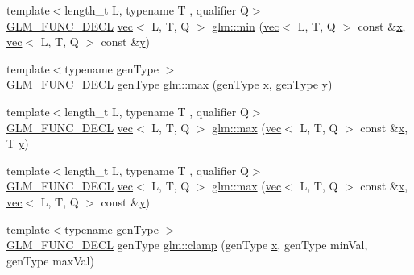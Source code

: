 \begin{DoxyCompactItemize}
\item 
{\footnotesize template$<$length\+\_\+t L, typename T , qualifier Q$>$ }\\\hyperlink{setup_8hpp_ab2d052de21a70539923e9bcbf6e83a51}{G\+L\+M\+\_\+\+F\+U\+N\+C\+\_\+\+D\+E\+CL} \hyperlink{structglm_1_1vec}{vec}$<$ L, T, Q $>$ \hyperlink{group__core__func__common_ga734a374ca5c808e7bd9f74b6acfd7478}{glm\+::min} (\hyperlink{structglm_1_1vec}{vec}$<$ L, T, Q $>$ const \&\hyperlink{_s_d_l__opengl_8h_ad0e63d0edcdbd3d79554076bf309fd47}{x}, \hyperlink{structglm_1_1vec}{vec}$<$ L, T, Q $>$ const \&\hyperlink{_s_d_l__opengl_8h_a1675d9d7bb68e1657ff028643b4037e3}{y})
\item 
{\footnotesize template$<$typename gen\+Type $>$ }\\\hyperlink{setup_8hpp_ab2d052de21a70539923e9bcbf6e83a51}{G\+L\+M\+\_\+\+F\+U\+N\+C\+\_\+\+D\+E\+CL} gen\+Type \hyperlink{group__core__func__common_ga98caa7f95a94c86a86ebce893a45326c}{glm\+::max} (gen\+Type \hyperlink{_s_d_l__opengl_8h_ad0e63d0edcdbd3d79554076bf309fd47}{x}, gen\+Type \hyperlink{_s_d_l__opengl_8h_a1675d9d7bb68e1657ff028643b4037e3}{y})
\item 
{\footnotesize template$<$length\+\_\+t L, typename T , qualifier Q$>$ }\\\hyperlink{setup_8hpp_ab2d052de21a70539923e9bcbf6e83a51}{G\+L\+M\+\_\+\+F\+U\+N\+C\+\_\+\+D\+E\+CL} \hyperlink{structglm_1_1vec}{vec}$<$ L, T, Q $>$ \hyperlink{group__core__func__common_gae8b0964d30deabd0867b8d7ac44f067e}{glm\+::max} (\hyperlink{structglm_1_1vec}{vec}$<$ L, T, Q $>$ const \&\hyperlink{_s_d_l__opengl_8h_ad0e63d0edcdbd3d79554076bf309fd47}{x}, T \hyperlink{_s_d_l__opengl_8h_a1675d9d7bb68e1657ff028643b4037e3}{y})
\item 
{\footnotesize template$<$length\+\_\+t L, typename T , qualifier Q$>$ }\\\hyperlink{setup_8hpp_ab2d052de21a70539923e9bcbf6e83a51}{G\+L\+M\+\_\+\+F\+U\+N\+C\+\_\+\+D\+E\+CL} \hyperlink{structglm_1_1vec}{vec}$<$ L, T, Q $>$ \hyperlink{group__core__func__common_gad48b723358c68d45477c22ff0101985e}{glm\+::max} (\hyperlink{structglm_1_1vec}{vec}$<$ L, T, Q $>$ const \&\hyperlink{_s_d_l__opengl_8h_ad0e63d0edcdbd3d79554076bf309fd47}{x}, \hyperlink{structglm_1_1vec}{vec}$<$ L, T, Q $>$ const \&\hyperlink{_s_d_l__opengl_8h_a1675d9d7bb68e1657ff028643b4037e3}{y})
\item 
{\footnotesize template$<$typename gen\+Type $>$ }\\\hyperlink{setup_8hpp_ab2d052de21a70539923e9bcbf6e83a51}{G\+L\+M\+\_\+\+F\+U\+N\+C\+\_\+\+D\+E\+CL} gen\+Type \hyperlink{group__core__func__common_ga93bce26c7d80d30a62f5c508f8498a6c}{glm\+::clamp} (gen\+Type \hyperlink{_s_d_l__opengl_8h_ad0e63d0edcdbd3d79554076bf309fd47}{x}, gen\+Type min\+Val, gen\+Type max\+Val)

\end{DoxyCompactItemize}
